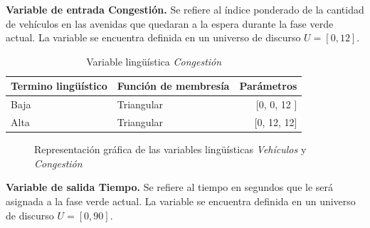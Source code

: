 \textbf{Variable de entrada Congestión.} Se refiere al índice ponderado de la cantidad de vehículos en las avenidas que quedaran a la espera durante la fase verde actual. La variable se encuentra definida en un universo de discurso $U = [0,12]$.

\begin{table}[!h]
	\centering
	\begin{tabular}{llr} \toprule
		Termino lingüístico & Función de membresía & Parámetros \\ \midrule
		Baja & Triangular & [0, 0, 12 ] \\
		Alta & Triangular & [0, 12, 12] \\ \bottomrule
	\end{tabular}
	\caption[Variable lingüística \textit{Congestión} (configuración \textit{A})]{Variable lingüística \textit{Congestión}}
\end{table}

\begin{figure}[H]
	\centering
	\caption[Representación gráfica de las variables lingüísticas \textit{Vehículos} y \textit{Congestión} (configuración \textit{A})]{Representación gráfica de las variables lingüísticas \textit{Vehículos} y \textit{Congestión}}
\end{figure}

\newpage
\textbf{Variable de salida Tiempo.} Se refiere al tiempo en segundos que le será asignada a la fase verde actual. La variable se encuentra definida en un universo de discurso $U = [0,90]$.

